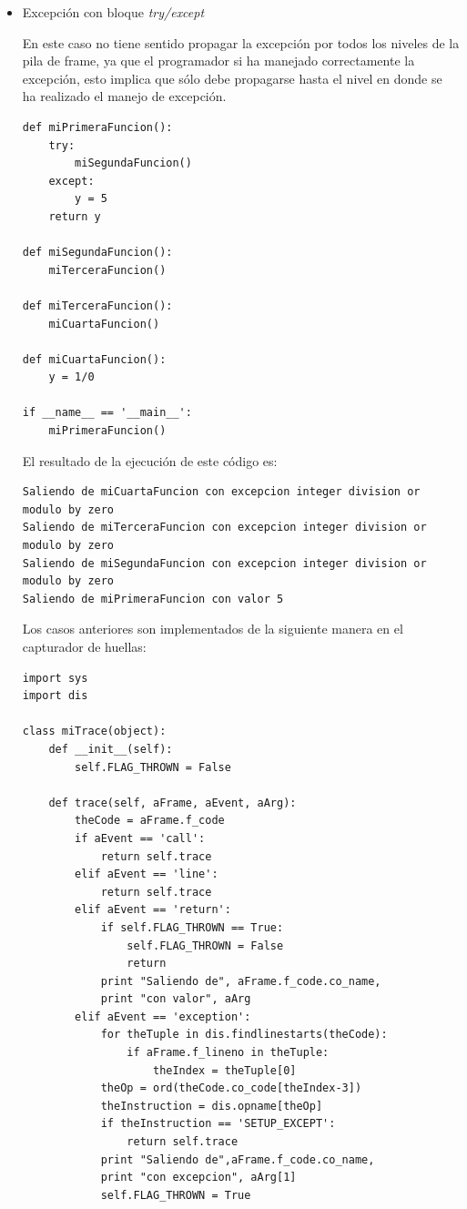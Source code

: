 \documentclass[12pt,legalpaper]{report}
\begin{document}
\begin{itemize}
	\item Excepción con bloque \textit{try/except} 

En este caso no tiene sentido propagar la excepción por todos los niveles de la pila de frame, ya que el programador si ha manejado correctamente la excepción, esto implica que sólo debe propagarse hasta el nivel en donde se ha realizado el manejo de excepción.	

\begin{singlespace}
\begin{lstlisting}[style=Python]
def miPrimeraFuncion():
    try:
        miSegundaFuncion()
    except:
        y = 5
    return y
    
def miSegundaFuncion():
    miTerceraFuncion()

def miTerceraFuncion():
    miCuartaFuncion()

def miCuartaFuncion():
    y = 1/0

if __name__ == '__main__':
    miPrimeraFuncion()
\end{lstlisting}
\end{singlespace}

El resultado de la ejecución de este código es:

\begin{singlespace}
\begin{lstlisting}[style=consola,numbers=none]
Saliendo de miCuartaFuncion con excepcion integer division or modulo by zero
Saliendo de miTerceraFuncion con excepcion integer division or modulo by zero
Saliendo de miSegundaFuncion con excepcion integer division or modulo by zero
Saliendo de miPrimeraFuncion con valor 5
\end{lstlisting}
\end{singlespace}	

Los casos anteriores son implementados de la siguiente manera en el capturador de huellas:

\begin{singlespace}
\begin{lstlisting}[style=Python]
import sys
import dis

class miTrace(object):
    def __init__(self):
        self.FLAG_THROWN = False
        
    def trace(self, aFrame, aEvent, aArg):
        theCode = aFrame.f_code
        if aEvent == 'call':
            return self.trace
        elif aEvent == 'line':
            return self.trace
        elif aEvent == 'return':
            if self.FLAG_THROWN == True:
                self.FLAG_THROWN = False
                return            
            print "Saliendo de", aFrame.f_code.co_name, 
            print "con valor", aArg
        elif aEvent == 'exception':
            for theTuple in dis.findlinestarts(theCode):
                if aFrame.f_lineno in theTuple:
                    theIndex = theTuple[0]
            theOp = ord(theCode.co_code[theIndex-3])
            theInstruction = dis.opname[theOp]
            if theInstruction == 'SETUP_EXCEPT':
                return self.trace
            print "Saliendo de",aFrame.f_code.co_name,
            print "con excepcion", aArg[1]
            self.FLAG_THROWN = True         


\end{lstlisting}
\end{singlespace}
\end{itemize}
\end{document}
